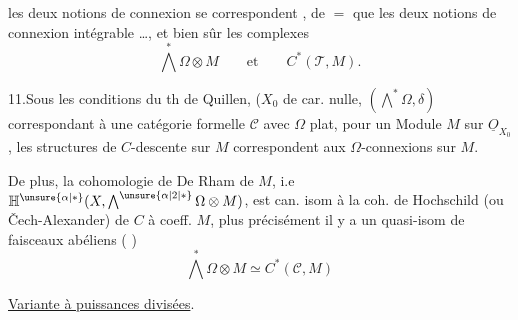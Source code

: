les deux notions de connexion se correspondent , de $=$ que les deux notions de  connexion intégrable \ldots, et bien sûr les complexes
\[
\bigwedge^*\Omega\otimes M\qquad\text{et}\qquad C^*(\mathscr T,M).
\]

11.\quad Sous les conditions du th de Quillen, ($X_0$ de car. nulle,  $(\bigwedge^*\Omega,\delta)$  correspondant à une catégorie formelle $\mathcal C$ avec $\Omega$ plat, pour un Module $M$ sur $\underline O_{X_0}$, les structures de $C$-descente sur $M$ correspondent aux  $\Omega$-connexions sur $M$.


De plus, la cohomologie de De Rham de $M$, i.e $\mathbb H^{\unsure{\alpha|*}}(X,\bigwedge^{\unsure{\alpha|2|*}}\Omega\otimes M)$, est can. isom à la coh. de Hochschild (ou Čech-Alexander) de $C$ à coeff.  $M$, plus précisément il y a un quasi-isom  de  faisceaux abéliens ( )
\[
\bigwedge^*\Omega\otimes M\simeq C^*(\mathcal C,M)
\]

\uline{Variante à puissances divisées}.


